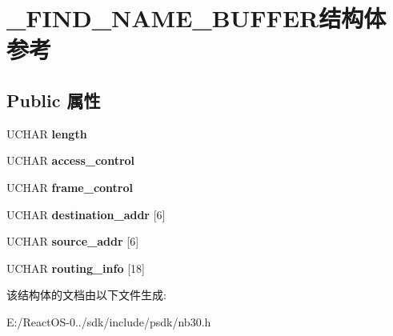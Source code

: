 \hypertarget{struct___f_i_n_d___n_a_m_e___b_u_f_f_e_r}{}\section{\+\_\+\+F\+I\+N\+D\+\_\+\+N\+A\+M\+E\+\_\+\+B\+U\+F\+F\+E\+R结构体 参考}
\label{struct___f_i_n_d___n_a_m_e___b_u_f_f_e_r}
\subsection*{Public 属性}
\begin{DoxyCompactItemize}
\item 
\mbox{\label{struct___f_i_n_d___n_a_m_e___b_u_f_f_e_r_a0bcd767613059f0a0d4d3d422081a0ab}} 
U\+C\+H\+AR {\bfseries length}
\item 
\mbox{\label{struct___f_i_n_d___n_a_m_e___b_u_f_f_e_r_a7be84a8541f7a1f8d188dbc4e1e67eb6}} 
U\+C\+H\+AR {\bfseries access\+\_\+control}
\item 
\mbox{\label{struct___f_i_n_d___n_a_m_e___b_u_f_f_e_r_a647626533a3ebcf8604795a9b33c95a8}} 
U\+C\+H\+AR {\bfseries frame\+\_\+control}
\item 
\mbox{\label{struct___f_i_n_d___n_a_m_e___b_u_f_f_e_r_aa7f906c52f0f770b4d65376d72034c99}} 
U\+C\+H\+AR {\bfseries destination\+\_\+addr} \mbox{[}6\mbox{]}
\item 
\mbox{\label{struct___f_i_n_d___n_a_m_e___b_u_f_f_e_r_a5cb288b5064fc3e9a8e5423ab3402314}} 
U\+C\+H\+AR {\bfseries source\+\_\+addr} \mbox{[}6\mbox{]}
\item 
\mbox{\label{struct___f_i_n_d___n_a_m_e___b_u_f_f_e_r_aee67e193caf3fb3a584e0ffd6638ec68}} 
U\+C\+H\+AR {\bfseries routing\+\_\+info} \mbox{[}18\mbox{]}
\end{DoxyCompactItemize}


该结构体的文档由以下文件生成\+:\begin{DoxyCompactItemize}
\item 
E\+:/\+React\+O\+S-\/0../sdk/include/psdk/nb30.\+h\end{DoxyCompactItemize}
